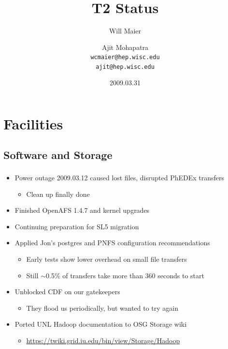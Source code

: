 \documentclass{beamer}
\title{T2 Status}
\author[Maier, Mohapatra]{
    Will Maier \and Ajit Mohapatra\\ 
    {\tt wcmaier@hep.wisc.edu}\\
    {\tt ajit@hep.wisc.edu}}
\institute[Wisconsin]{University of Wisconsin - High Energy Physics}
\date{2009.03.31}
\newcommand{\ca}{\ensuremath{\sim}}
\begin{document}
\begin{frame}
    \titlepage
\end{frame}


\section{Facilities}
\subsection{Software and Storage}
\begin{frame}
\frametitle{}
\begin{itemize}
    \item Power outage 2009.03.12 caused lost files, disrupted PhEDEx transfers
    \begin{itemize}
        \item Clean up finally done
    \end{itemize}
    \item Finished OpenAFS 1.4.7 and kernel upgrades
    \item Continuing preparation for SL5 migration
    \item Applied Jon's postgres and PNFS configuration recommendations
    \begin{itemize}
        \item Early tests show lower overhead on small file transfers
        \item Still \ca{}0.5\% of transfers take more than 360 seconds to start
    \end{itemize}
    \item Unblocked CDF on our gatekeepers
    \begin{itemize}
        \item They flood us periodically, but wanted to try again
    \end{itemize}
    \item Ported UNL Hadoop documentation to OSG Storage wiki
    \begin{itemize}
        \item \url{https://twiki.grid.iu.edu/bin/view/Storage/Hadoop}
    \end{itemize}
\end{itemize}
\end{frame}
\end{document}
